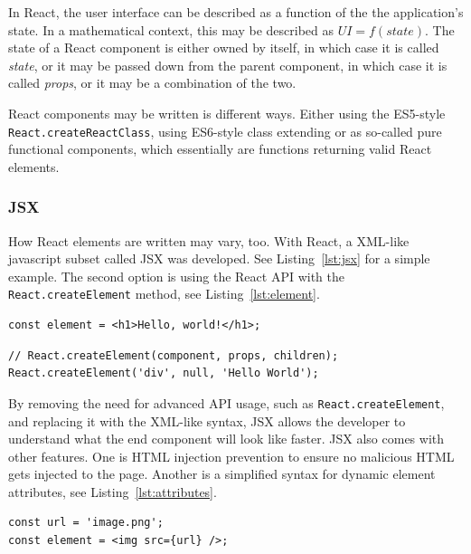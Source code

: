 In React, the user interface can be described as a function of the the application's state. In a mathematical context, this may be described as $UI = f(state)$. The state of a React component is either owned by itself, in which case it is called \emph{state}, or it may be passed down from the parent component, in which case it is called \emph{props}, or it may be a combination of the two.

React components may be written is different ways. Either using the ES5-style \cite{es5} \texttt{React.createReactClass}, using ES6-style \cite{es6} class extending or as so-called pure functional components, which essentially are functions returning valid React elements.

\subsubsection{JSX}\label{sec:jsx}

How React elements are written may vary, too. With React, a XML-like javascript subset called JSX was developed. See Listing~\ref{lst:jsx} for a simple example. The second option is using the React API with the \texttt{React.createElement} method, see Listing~\ref{lst:element}.

\begin{lstlisting}[caption={Simple JSX example snippet},label=lst:jsx]
const element = <h1>Hello, world!</h1>;
\end{lstlisting}

\begin{lstlisting}[caption={Usage of React.createElement},label=lst:element]
// React.createElement(component, props, children);
React.createElement('div', null, 'Hello World');
\end{lstlisting}

By removing the need for advanced API usage, such as \texttt{React.createElement}, and replacing it with the XML-like syntax, JSX allows the developer to understand what the end component will look like faster. JSX also comes with other features. One is HTML injection prevention to ensure no malicious HTML gets injected to the page. Another is a simplified syntax for dynamic element attributes, see Listing~\ref{lst:attributes}.

\begin{lstlisting}[caption={Element attributes in JSX},label=lst:attributes]
const url = 'image.png';
const element = <img src={url} />;
\end{lstlisting}

